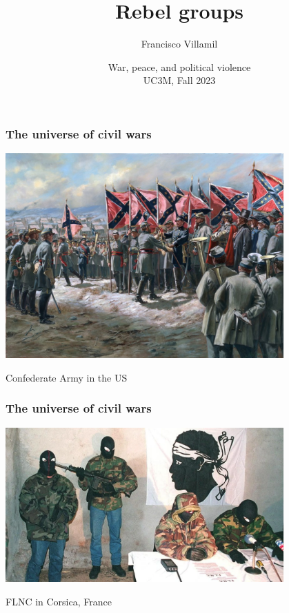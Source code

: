 \documentclass[aspectratio=43]{beamer}
\title{\huge Rebel groups}
\author{Francisco Villamil}
\date{War, peace, and political violence\\UC3M, Fall 2023}
\begin{document}
\begin{frame}
  \titlepage
\end{frame}


\begin{frame}
\frametitle{The universe of civil wars}
\centering

\includegraphics[width = 0.8\textwidth]{img/confederate}

\vspace{15pt}

Confederate Army in the US

\end{frame}

%
%
%
%

\begin{frame}
\frametitle{The universe of civil wars}
\centering

\includegraphics[width = 0.8\textwidth]{img/flnc}

FLNC in Corsica, France

\end{frame}
\end{document}
